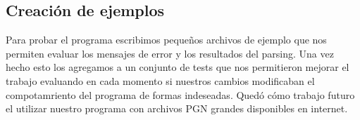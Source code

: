 \subsection{Creación de ejemplos}
Para probar el programa escribimos pequeños archivos de ejemplo que nos permiten evaluar los mensajes de error y los resultados del parsing. Una vez hecho esto los agregamos a un conjunto de tests que nos permitieron mejorar el trabajo evaluando en cada momento si nuestros cambios modificaban el compotamriento del programa de formas indeseadas. Quedó cómo trabajo futuro el utilizar nuestro programa con archivos PGN grandes disponibles en internet.

